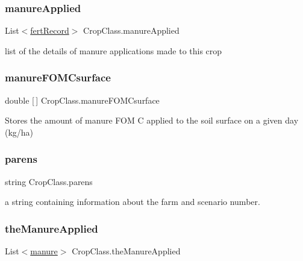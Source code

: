 \subsubsection{\texorpdfstring{manureApplied}{manureApplied}}
{\footnotesize\ttfamily List$<$\mbox{\hyperlink{classfert_record}{fert\+Record}}$>$ Crop\+Class.\+manure\+Applied}



list of the details of manure applications made to this crop 

\mbox{\label{class_crop_class_a5d9c59d163042fa681af5bf114320b7e}} 
\subsubsection{\texorpdfstring{manureFOMCsurface}{manureFOMCsurface}}
{\footnotesize\ttfamily double \mbox{[}$\,$\mbox{]} Crop\+Class.\+manure\+F\+O\+M\+Csurface}



Stores the amount of manure F\+OM C applied to the soil surface on a given day (kg/ha) 

\mbox{\label{class_crop_class_a157b2bf636da40932ea48a3249393492}} 
\subsubsection{\texorpdfstring{parens}{parens}}
{\footnotesize\ttfamily string Crop\+Class.\+parens}



a string containing information about the farm and scenario number. 

\mbox{\label{class_crop_class_a1bc000e4e6a0cf14b434274ef79df30c}} 
\subsubsection{\texorpdfstring{theManureApplied}{theManureApplied}}
{\footnotesize\ttfamily List$<$\mbox{\hyperlink{classmanure}{manure}}$>$ Crop\+Class.\+the\+Manure\+Applied}



